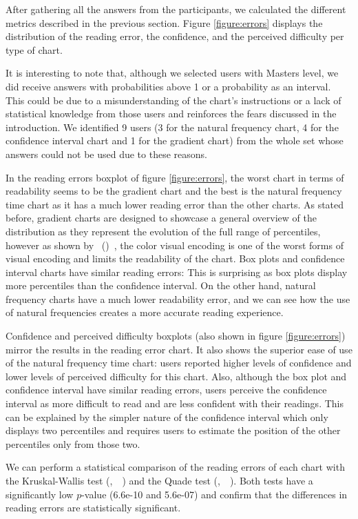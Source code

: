 \documentclass[a4paper,3p,sort&compress]{elsarticle}
\DeclareRobustCommand{\citeext}[1]{\citeauthor{#1},~\citeyear{#1}~\cite{#1}}
\DeclareRobustCommand{\citeextp}[1]{\citeauthor{#1}~(\citeyear{#1})~\cite{#1}}
\begin{document}
After gathering all the answers from the participants, we calculated the
different metrics described in the previous section. Figure \ref{figure:errors}
displays the distribution of the reading error, the confidence, and the
perceived difficulty per type of chart.

It is interesting to note that, although we selected users with Masters level,
we did receive answers with probabilities above 1 or a probability as an
interval. This could be due to a misunderstanding of the chart's instructions or
a lack of statistical knowledge from those users and reinforces the fears
discussed in the introduction. We identified 9 users (3 for the natural
frequency chart, 4 for the confidence interval chart and 1 for the gradient
chart) from the whole set whose answers could not be used due to these reasons.

In the reading errors boxplot of figure \ref{figure:errors}, the worst chart in
terms of readability seems to be the gradient chart and the best is the natural
frequency time chart as it has a much lower reading error than the other charts.
As stated before, gradient charts are designed to showcase a general overview of
the distribution as they represent the evolution of the full range of
percentiles, however as shown by \citeextp{cleveland_graphical_1984}, the
color visual encoding is one of the worst forms of visual encoding and
limits the readability of the chart. Box plots and confidence interval charts
have similar reading errors: This is surprising as box plots display more
percentiles than the confidence interval. On the other hand, natural frequency
charts have a much lower readability error, and we can see how the use of
natural frequencies creates a more accurate reading experience.

Confidence and perceived difficulty boxplots (also shown in figure
\ref{figure:errors}) mirror the results in the reading error chart. It also
shows the superior ease of use of the natural frequency time chart: users
reported higher levels of confidence and lower levels of perceived difficulty
for this chart. Also, although the box plot and confidence interval have similar
reading errors, users perceive the confidence interval as more difficult to read
and are less confident with their readings. This can be explained by the simpler
nature of the confidence interval which only displays two percentiles and
requires users to estimate the position of the other percentiles only from those
two.

We can perform a statistical comparison of the reading errors of each chart with
the Kruskal-Wallis test (\citeext{krustal}) 
and the Quade test (\citeext{quade_rank_1967}). 
Both tests have a significantly low $p$-value (6.6e-10
and 5.6e-07) and confirm that the differences in reading errors are
statistically significant.
\end{document}

